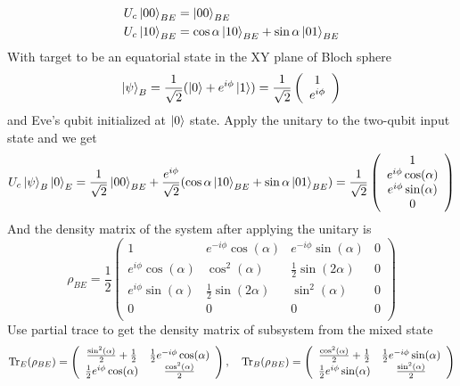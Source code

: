 \begin{align}
    \label{eqn:eco_def1}
    &U_{c}\ket{00}_{BE}=\ket{00}_{BE}\\
    \label{eqn:eco_def2}
    &U_{c}\ket{10}_{BE}=\cos\alpha\ket{10}_{BE}+\sin\alpha\ket{01}_{BE} 
\end{align}
With target to be an equatorial state in the XY plane of Bloch sphere
\[
\ket{\psi}_B=\frac{1}{\sqrt{2}}(\ket{0}+e^{i\phi}\ket{1})=\frac{1}{\sqrt{2}}\left(
    \begin{array}{c}
     1 \\
     e^{i \phi } \\
    \end{array}
    \right)
\]
and Eve's qubit initialized at $\ket{0}$ state.
Apply the unitary to the two-qubit input state and we get 
\[
U_c\ket{\psi}_B\ket{0}_E=\frac{1}{\sqrt{2}}\ket{00}_{BE}+\frac{e^{i\phi}}{\sqrt{2}}(\cos\alpha\ket{10}_{BE}+\sin\alpha\ket{01}_{BE})
=\frac{1}{\sqrt{2}}\left(
    \begin{array}{c}
     1 \\
     e^{i \phi } \cos (\alpha ) \\
     e^{i \phi } \sin (\alpha ) \\
     0 \\
    \end{array}
    \right)
\]
And the density matrix of the system after applying the unitary is 
\begin{equation}
    \label{eqn:post_state}
    \rho_{BE}= \frac{1}{2}   \left(
        \begin{array}{cccc}
            1 & e^{-i \phi } \cos (\alpha ) & e^{-i \phi } \sin (\alpha ) & 0 \\
            e^{i \phi } \cos (\alpha ) & \cos ^2(\alpha ) & \frac{1}{2} \sin (2 \alpha ) & 0 \\
            e^{i \phi } \sin (\alpha ) & \frac{1}{2} \sin (2 \alpha ) & \sin ^2(\alpha ) & 0 \\
            0 & 0 & 0 & 0 \\
        \end{array}
        \right)
\end{equation}
Use partial trace to get the density matrix of subsystem from the mixed state 
\[
    \Tr_E(\rho_{BE})= \left(
        \begin{array}{cc}
         \frac{\sin ^2(\alpha )}{2}+\frac{1}{2} & \frac{1}{2} e^{-i \phi } \cos (\alpha ) \\
         \frac{1}{2} e^{i \phi } \cos (\alpha ) & \frac{\cos ^2(\alpha )}{2} \\
        \end{array}
        \right),\quad 
    \Tr_B(\rho_{BE})=\left(
        \begin{array}{cc}
        \frac{\cos ^2(\alpha )}{2}+\frac{1}{2} & \frac{1}{2} e^{-i \phi } \sin (\alpha ) \\
        \frac{1}{2} e^{i \phi } \sin (\alpha ) & \frac{\sin ^2(\alpha )}{2} \\
        \end{array}
        \right)
\]
